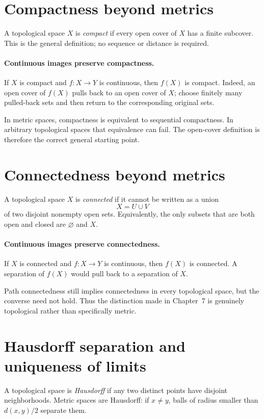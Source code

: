 \section{Compactness beyond metrics}
A topological space \(X\) is \emph{compact} if every open cover of \(X\) has a finite subcover. This is the general definition; no sequence or distance is required.

\paragraph{Continuous images preserve compactness.}
If \(X\) is compact and \(f:X\to Y\) is continuous, then \(f(X)\) is compact. Indeed, an open cover of \(f(X)\) pulls back to an open cover of \(X\); choose finitely many pulled-back sets and then return to the corresponding original sets.

In metric spaces, compactness is equivalent to sequential compactness. In arbitrary topological spaces that equivalence can fail. The open-cover definition is therefore the correct general starting point.

\section{Connectedness beyond metrics}
A topological space \(X\) is \emph{connected} if it cannot be written as a union
\[
X=U\cup V
\]
of two disjoint nonempty open sets. Equivalently, the only subsets that are both open and closed are \(\varnothing\) and \(X\).

\paragraph{Continuous images preserve connectedness.}
If \(X\) is connected and \(f:X\to Y\) is continuous, then \(f(X)\) is connected. A separation of \(f(X)\) would pull back to a separation of \(X\).

Path connectedness still implies connectedness in every topological space, but the converse need not hold. Thus the distinction made in Chapter~7 is genuinely topological rather than specifically metric.

\section{Hausdorff separation and uniqueness of limits}
A topological space is \emph{Hausdorff} if any two distinct points have disjoint neighborhoods. Metric spaces are Hausdorff: if \(x\ne y\), balls of radius smaller than \(d(x,y)/2\) separate them.

